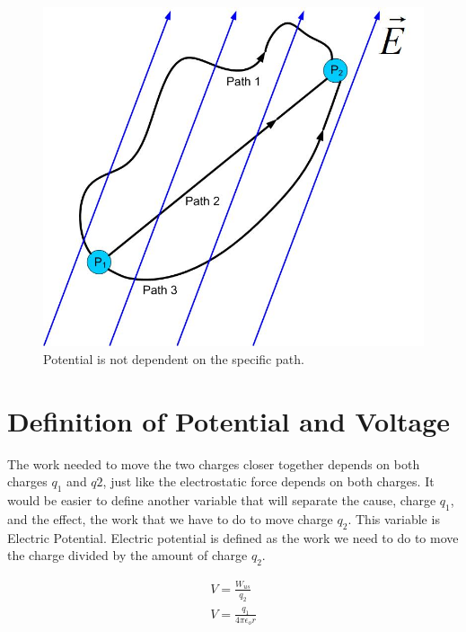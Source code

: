 \documentclass{ximera}
\begin{document}
\begin{figure}[htbp]
\begin{center}
\includegraphics[scale=0.5]{../jpg/workindependentofpath.jpg}
\end{center} 
\caption{Potential is not dependent on the specific path.}\label{PotentialWork}
\end{figure}







\section{Definition of Potential and Voltage}


The work needed to move the two charges closer together depends on both charges $q_1$ and $q2$, just like the electrostatic force depends on both charges. It would be easier to define another variable that will separate the cause, charge $q_1$, and the effect, the work that we have to do to move charge $q_2$. This variable is Electric Potential. Electric potential is defined as the work we need to do to move the charge divided by the amount of charge $q_2$.

\begin{eqnarray}
V=\frac{W_{us}}{q_2} \\
V=\frac{q_1}{4 \pi \epsilon_o r} \label{Potential2}
\end{eqnarray}
\end{document}
